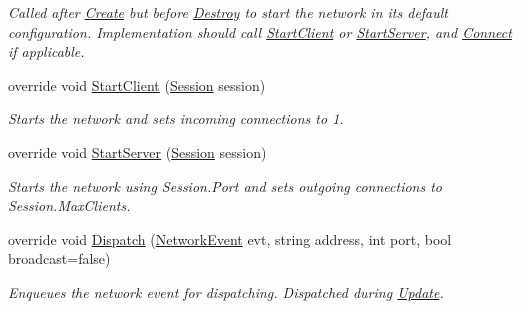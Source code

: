 \begin{DoxyCompactItemize}
\begin{DoxyCompactList}\small\item\em Called after \hyperlink{class_skyrates_1_1_common_1_1_network_1_1_network_common_a575172eb9f965e181e19649bcce38ca0}{Create} but before \hyperlink{class_skyrates_1_1_common_1_1_network_1_1_network_common_aa00266a16aa27dfd0eb242c74856a92a}{Destroy} to start the network in its default configuration. Implementation should call \hyperlink{class_skyrates_1_1_common_1_1_network_1_1_network_common_a982b732d621ff3f8738319053af8d154}{Start\-Client} or \hyperlink{class_skyrates_1_1_common_1_1_network_1_1_network_common_ac1209cf3fc31d2f145678971472ec20c}{Start\-Server}, and \hyperlink{class_skyrates_1_1_common_1_1_network_1_1_network_common_aa11961a4a6dc22c782552eb96e27c6e1}{Connect} if applicable.  \end{DoxyCompactList}\item 
override void \hyperlink{class_skyrates_1_1_client_1_1_network_1_1_dummy_client_a9d69f75af0008f2ae3da1f040814add4}{Start\-Client} (\hyperlink{class_skyrates_1_1_common_1_1_network_1_1_session}{Session} session)
\begin{DoxyCompactList}\small\item\em Starts the network and sets incoming connections to 1. \end{DoxyCompactList}\item 
override void \hyperlink{class_skyrates_1_1_client_1_1_network_1_1_dummy_client_a450524b38c78346452f8f7127c14bc8b}{Start\-Server} (\hyperlink{class_skyrates_1_1_common_1_1_network_1_1_session}{Session} session)
\begin{DoxyCompactList}\small\item\em Starts the network using Session.\-Port and sets outgoing connections to Session.\-Max\-Clients. \end{DoxyCompactList}\item 
override void \hyperlink{class_skyrates_1_1_client_1_1_network_1_1_dummy_client_ace4de9938d7ca4c3d008f2e9355e96c0}{Dispatch} (\hyperlink{class_skyrates_1_1_common_1_1_network_1_1_event_1_1_network_event}{Network\-Event} evt, string address, int port, bool broadcast=false)
\begin{DoxyCompactList}\small\item\em Enqueues the network event for dispatching. Dispatched during \hyperlink{class_skyrates_1_1_client_1_1_network_1_1_dummy_client_a293ecc1918e24e8da6002a2491277333}{Update}. \end{DoxyCompactList}\item 

\end{DoxyCompactItemize}
